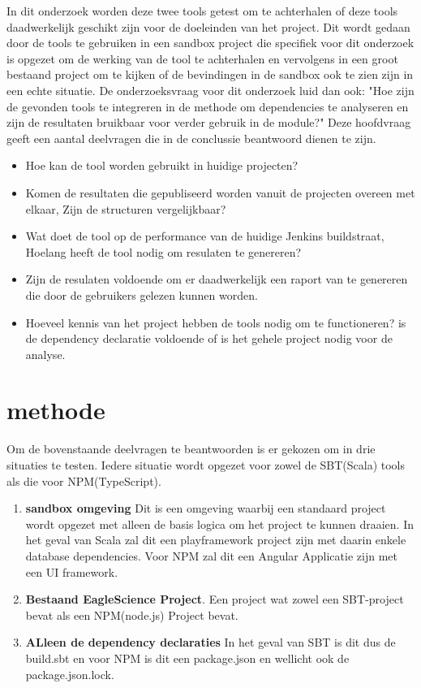 In dit onderzoek worden deze twee tools getest om te achterhalen of deze tools daadwerkelijk geschikt zijn voor de doeleinden van het project. Dit wordt gedaan door de tools te gebruiken in een sandbox project die specifiek voor dit onderzoek is opgezet om de werking van de tool te achterhalen en vervolgens in een groot bestaand project om te kijken of de bevindingen in de sandbox ook te zien zijn in een echte situatie.
De onderzoeksvraag voor dit onderzoek luid dan ook: "Hoe zijn de gevonden tools te integreren in de methode om dependencies te analyseren en zijn de resultaten bruikbaar voor verder gebruik in de module?" Deze hoofdvraag geeft een aantal deelvragen die in de conclussie beantwoord dienen te zijn.
\begin{itemize}
    \item Hoe kan de tool worden gebruikt in huidige projecten?
    \item Komen de resultaten die gepubliseerd worden vanuit de projecten overeen met elkaar, Zijn de structuren vergelijkbaar?
    \item Wat doet de tool op de performance van de huidige Jenkins buildstraat, Hoelang heeft de tool nodig om resulaten te genereren?
    \item Zijn de resulaten voldoende om er daadwerkelijk een raport van te genereren die door de gebruikers gelezen kunnen worden.
    \item Hoeveel kennis van het project hebben de tools nodig om te functioneren? is de dependency declaratie voldoende of is het gehele project nodig voor de analyse.
\end{itemize}


\section{methode}
Om de bovenstaande deelvragen te beantwoorden is er gekozen om in drie situaties te testen. Iedere situatie wordt opgezet voor zowel de SBT(Scala) tools als die voor NPM(TypeScript).
\begin{enumerate}
    \item \textbf{sandbox omgeving} Dit is een omgeving waarbij een standaard project wordt opgezet met alleen de basis logica om het project te kunnen draaien. In het geval van Scala zal dit een playframework project zijn met daarin enkele database dependencies. Voor NPM zal dit een Angular Applicatie zijn met een UI framework.
    \item \textbf{Bestaand EagleScience Project}. Een project wat zowel een SBT-project bevat als een NPM(node.js) Project bevat.
    \item \textbf{ALleen de dependency declaraties} In het geval van SBT is dit dus de build.sbt en voor NPM is dit  een package.json en wellicht ook de package.json.lock.
\end{enumerate}

